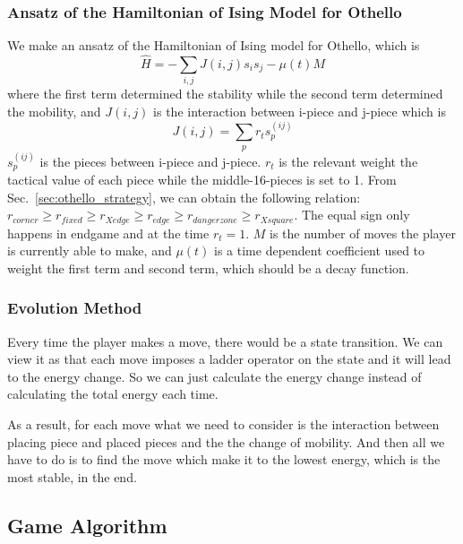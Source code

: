 \documentclass[aps,pra,reprint,amsmath,amssymb,floatfix]{revtex4-2}
\begin{document}
\subsubsection{Ansatz of the Hamiltonian of Ising Model for Othello}
We make an ansatz of the Hamiltonian of Ising model for Othello, which is
\begin{equation}
    \hat{H}=-\sum_{i,j}J(i,j)s_is_j-\mu(t)M
\end{equation}
where the first term determined the stability while the second term determined the mobility, and $J(i,j)$ is the interaction between i-piece and j-piece which is
\begin{equation}
    J(i,j) = \sum_p r_ts_p^{(ij)}
\end{equation}
$s_p^{(ij)}$ is the pieces between i-piece and j-piece. $r_t$ is the relevant weight the tactical value of each piece while the middle-16-pieces is set to 1. From Sec.~\ref{sec:othello_strategy}, we can obtain the following relation:
$r_{corner} \geq r_{fixed} \geq r_{X edge} \geq r_{edge}\geq r_{danger zone} \geq r_{X square}$.
The equal sign only happens in endgame and at the time $r_t = 1$. $M$ is the number of moves the
player is currently able to make, and $\mu(t)$ is a time dependent coefficient used to weight the first term and second term, which should be a decay function.

\subsubsection{Evolution Method}
Every time the player makes a move, there would be a state transition. We can view it as that each move imposes a ladder operator on the state and it will lead to the energy change. So we can just calculate the energy change instead of calculating the total energy each time. 

As a result, for each move what we need to consider is the interaction between placing piece and placed pieces and the the change of mobility. And then all we have to do is to find the move which make it to the lowest energy, which is the most stable, in the end.

\subsection{Game Algorithm}
\end{document}
